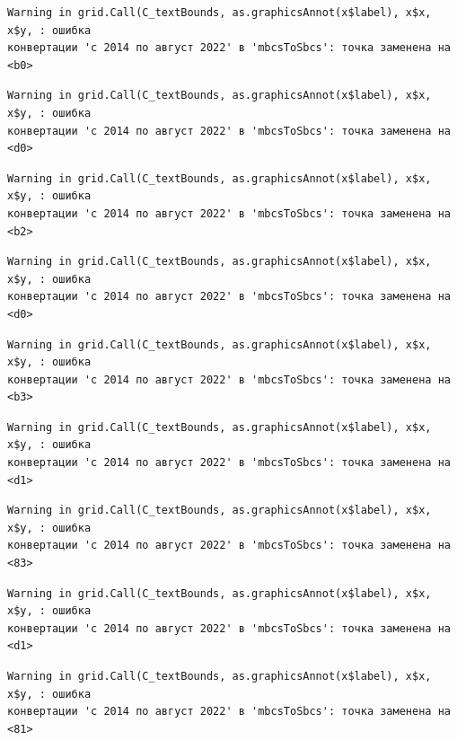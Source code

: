 \documentclass[
  letterpaper,
  DIV=11,
  numbers=noendperiod]{scrreprt}
\begin{document}
\begin{verbatim}
Warning in grid.Call(C_textBounds, as.graphicsAnnot(x$label), x$x, x$y, : ошибка
конвертации 'с 2014 по август 2022' в 'mbcsToSbcs': точка заменена на <b0>
\end{verbatim}

\begin{verbatim}
Warning in grid.Call(C_textBounds, as.graphicsAnnot(x$label), x$x, x$y, : ошибка
конвертации 'с 2014 по август 2022' в 'mbcsToSbcs': точка заменена на <d0>
\end{verbatim}

\begin{verbatim}
Warning in grid.Call(C_textBounds, as.graphicsAnnot(x$label), x$x, x$y, : ошибка
конвертации 'с 2014 по август 2022' в 'mbcsToSbcs': точка заменена на <b2>
\end{verbatim}

\begin{verbatim}
Warning in grid.Call(C_textBounds, as.graphicsAnnot(x$label), x$x, x$y, : ошибка
конвертации 'с 2014 по август 2022' в 'mbcsToSbcs': точка заменена на <d0>
\end{verbatim}

\begin{verbatim}
Warning in grid.Call(C_textBounds, as.graphicsAnnot(x$label), x$x, x$y, : ошибка
конвертации 'с 2014 по август 2022' в 'mbcsToSbcs': точка заменена на <b3>
\end{verbatim}

\begin{verbatim}
Warning in grid.Call(C_textBounds, as.graphicsAnnot(x$label), x$x, x$y, : ошибка
конвертации 'с 2014 по август 2022' в 'mbcsToSbcs': точка заменена на <d1>
\end{verbatim}

\begin{verbatim}
Warning in grid.Call(C_textBounds, as.graphicsAnnot(x$label), x$x, x$y, : ошибка
конвертации 'с 2014 по август 2022' в 'mbcsToSbcs': точка заменена на <83>
\end{verbatim}

\begin{verbatim}
Warning in grid.Call(C_textBounds, as.graphicsAnnot(x$label), x$x, x$y, : ошибка
конвертации 'с 2014 по август 2022' в 'mbcsToSbcs': точка заменена на <d1>
\end{verbatim}

\begin{verbatim}
Warning in grid.Call(C_textBounds, as.graphicsAnnot(x$label), x$x, x$y, : ошибка
конвертации 'с 2014 по август 2022' в 'mbcsToSbcs': точка заменена на <81>
\end{verbatim}
\end{document}
